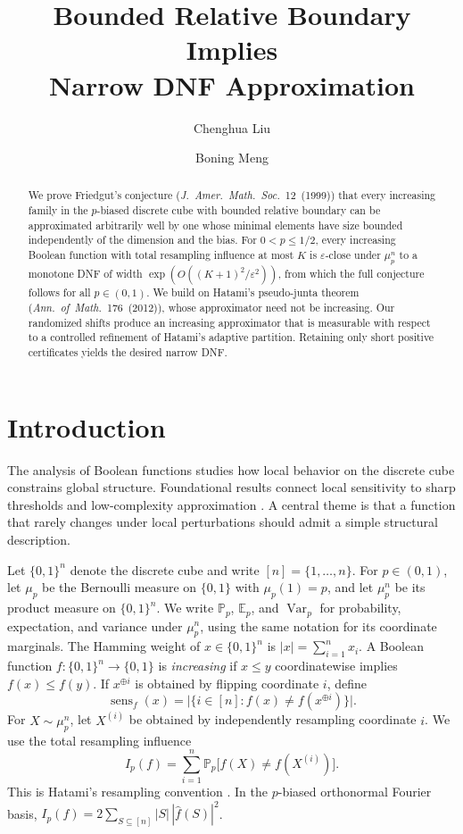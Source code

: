 \documentclass[11pt,letterpaper]{article}
\title{Bounded Relative Boundary Implies\\[2.4pt]
Narrow DNF Approximation}
\author[1]{Chenghua Liu}
\author[2]{Boning Meng}
\affil[1]{Institute of Software, Chinese Academy of Sciences, Beijing, China}
\affil[2]{University of Regensburg, Regensburg, Germany}
\affil[ ]{\href{mailto:liuch.russell@gmail.com}{\texttt{liuch.russell@gmail.com}},
  \href{mailto:mengboning2013@gmail.com}{\texttt{mengboning2013@gmail.com}}}
\date{}
\theoremstyle{definition}
\theoremstyle{remark}
\newcommand{\bits}{\{0,1\}}
\newcommand{\E}{\mathbb E}
\renewcommand{\Pr}{\mathbb P}
\newcommand{\Var}{\operatorname{Var}}
\newcommand{\sens}{\operatorname{sens}}
\begin{document}
\maketitle
\thispagestyle{empty}

\begin{abstract}
  \normalsize
  We prove Friedgut's conjecture (\mbox{\emph{J. Amer. Math. Soc.} 12 (1999)})
  that every increasing family in the $p$-biased discrete cube with bounded
  relative boundary can be approximated arbitrarily well by one whose minimal
  elements have size bounded independently of the dimension and the bias.
  For \mbox{$0<p\le1/2$}, every increasing Boolean function with total
  resampling influence at most $K$ is $\varepsilon$-close under $\mu_p^n$
  to a monotone DNF of width $\exp(O((K+1)^2/\varepsilon^2))$, from which
  the full conjecture follows for all $p\in(0,1)$.
  We build on Hatami's pseudo-junta theorem
  (\mbox{\emph{Ann. of Math.} 176 (2012)}), whose approximator need not be
  increasing. 
  Our randomized shifts produce an increasing approximator that is measurable with respect to a controlled refinement of Hatami's adaptive partition.
  Retaining only short positive certificates yields the desired
  narrow DNF.
\end{abstract}

\clearpage
{}

\section{Introduction}
\label{sec:introduction}

The analysis of Boolean functions studies how local behavior on the discrete
cube constrains global structure.  Foundational results connect local
sensitivity to sharp thresholds and low-complexity approximation
\cite{KahnKalaiLinial1988,FriedgutKalai1996,Friedgut1998}.  A central theme is
that a function that rarely changes under local perturbations should admit a
simple structural description.

Let $\bits^n$ denote the discrete cube and write $[n]=\{1,\ldots,n\}$.  For
$p\in(0,1)$, let $\mu_p$ be the Bernoulli measure on $\bits$ with
$\mu_p(1)=p$, and let
$\mu_p^n$ be its product measure on $\bits^n$.  We write $\Pr_p$, $\E_p$,
and $\Var_p$ for probability, expectation, and variance under $\mu_p^n$, using
the same notation for its coordinate marginals.  The Hamming weight of
$x\in\bits^n$ is
$|x|=\sum_{i=1}^n x_i$.  A Boolean function $f:\bits^n\to\bits$ is
\emph{increasing} if $x\le y$ coordinatewise implies $f(x)\le f(y)$.  If
$x^{\oplus i}$ is obtained by flipping coordinate $i$, define
\[
       \sens_f(x)=\bigl|\{i\in[n]:f(x)\ne f(x^{\oplus i})\}\bigr|.
\]
For $X\sim\mu_p^n$, let $X^{(i)}$ be obtained by independently resampling
coordinate $i$.  We use the total resampling influence
\[
       I_p(f)=\sum_{i=1}^n\Pr_p\bigl[f(X)\ne f(X^{(i)})\bigr].
\]
This is Hatami's resampling convention \cite[eq.~(9)]{Hatami2012}.
In the $p$-biased orthonormal Fourier basis,
$I_p(f)=2\sum_{S\subseteq[n]}|S|\,|\widehat f(S)|^2$.
\end{document}
